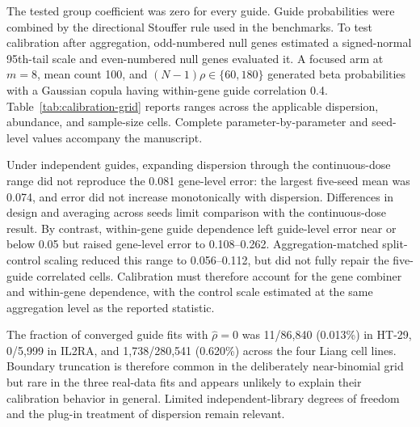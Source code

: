 The tested group coefficient was zero for every guide.  Guide probabilities
were combined by the directional Stouffer rule used in the benchmarks.  To
test calibration after aggregation, odd-numbered null genes estimated a
signed-normal 95th-tail scale and even-numbered null genes evaluated it. A
focused arm at $m=8$, mean count 100, and $(N-1)\rho\in\{60,180\}$ generated
beta probabilities with a Gaussian copula having within-gene guide correlation
0.4.  Table~\ref{tab:calibration-grid} reports ranges across the applicable
dispersion, abundance, and sample-size cells.  Complete parameter-by-parameter
and seed-level values accompany the manuscript.

Under independent guides, expanding dispersion through the continuous-dose
range did not reproduce the 0.081 gene-level error: the largest five-seed mean
was 0.074, and error did not increase monotonically with dispersion.
Differences in design and averaging across seeds limit comparison with the
continuous-dose result.  By contrast, within-gene guide dependence left
guide-level error near or below 0.05 but raised gene-level error to
0.108--0.262.  Aggregation-matched split-control scaling reduced this range to
0.056--0.112, but did not fully repair the five-guide correlated cells.
Calibration must therefore account for the gene combiner and within-gene
dependence, with the control scale estimated at the same aggregation level as
the reported statistic.

The fraction of converged guide fits with $\widehat\rho=0$ was 11/86,840
(0.013\%) in HT-29, 0/5,999 in IL2RA, and 1,738/280,541 (0.620\%) across the
four Liang cell lines.  Boundary truncation is therefore common in the
deliberately near-binomial grid but rare in the three real-data fits and
appears unlikely to explain their calibration behavior in general.  Limited
independent-library degrees of freedom and the plug-in treatment of dispersion
remain relevant.
